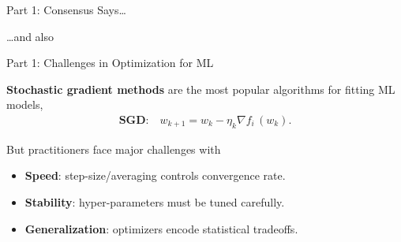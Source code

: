 \documentclass[mathserif,notheorems, hyperref={colorlinks, citecolor=blue, urlcolor=blue, linkcolor=blue}]{beamer}
\def\\{}%
\begin{document}
    \begin{frame}{Part 1: Consensus Says\ldots}

        \begin{center}
            \Large \dots and also~\citet{xu2017second,
            zhang2016parallel,
            patterson2017deep,
            pillaud2018statistical,
            grosse2015scaling,
            assran2018stochastic,
            damaskinos2019aggregathor,
            kawaguchi2020ordered,
            bernstein2018signsgd,
            li2019rsa,
            agarwal2017second,
            hofmann2015variance,
            geffner2019rule,
            assran2020convergence,
            gower2019sgd}
        \end{center}

    \end{frame}

    \begin{frame}{Part 1: Challenges in Optimization for ML}

        \textbf{Stochastic gradient methods} are the most popular algorithms for fitting ML models,
        \begin{align*}
            \textbf{SGD:} \quad w_{k + 1} = w_k - \eta_k \nabla f_i \, (w_k). \\
        \end{align*}


        But practitioners face major challenges with \vspace{0.5em}
        \begin{itemize}
            \item \textbf{Speed}: step-size/averaging controls convergence rate.
            \item \textbf{Stability}: hyper-parameters must be tuned carefully.
            \item \textbf{Generalization}: optimizers encode statistical tradeoffs.
        \end{itemize}
        \vspace{1em}

    \end{frame}
\end{document}

